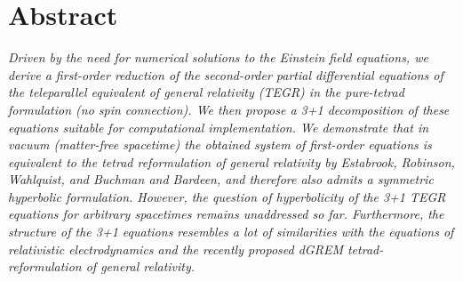 \documentclass[
10pt, %
a4paper, %
oneside, %
twocolumn,
headinclude,footinclude, %
BCOR5mm, %
]{scrartcl}
\begin{document}
	\section*{Abstract} %
	\noindent
	\textit{ Driven by the need for numerical solutions to the Einstein field
	equations, we derive a first-order reduction of the second-order partial
	differential equations of the teleparallel equivalent of general relativity
	(TEGR) in the pure-tetrad formulation (no spin connection). We then propose
	a 3+1 decomposition of these equations suitable for computational
	implementation. We demonstrate that in vacuum 	(matter-free spacetime) the
	obtained system of first-order equations is equivalent to the tetrad
	reformulation of general relativity by Estabrook, Robinson, Wahlquist, and
	Buchman and Bardeen, and therefore also admits a symmetric hyperbolic
	formulation. However, the question of hyperbolicity of the 3+1 TEGR
	equations for arbitrary spacetimes remains unaddressed so far. Furthermore,
	the structure of the 3+1  equations resembles a lot of similarities with the
	equations of relativistic electrodynamics and the recently proposed dGREM
	tetrad-reformulation of general relativity. }
	\renewcommand{\thefootnote}{\arabic{footnote}}
	
\end{document}
